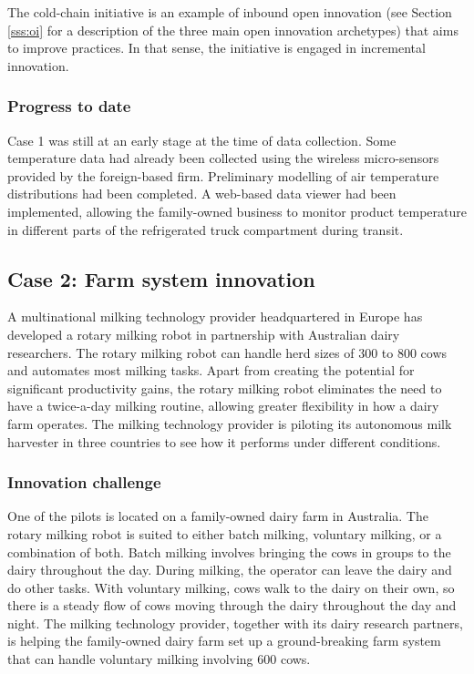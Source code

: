 The cold-chain initiative is an example of inbound open innovation (see Section \ref{sss:oi} for a description of the three main open innovation archetypes) that aims to improve practices. In that sense, the initiative is engaged in incremental innovation. 

\subsubsection{Progress to date}

Case 1 was still at an early stage at the time of data collection. Some temperature data had already been collected using the wireless micro-sensors provided by the foreign-based firm. Preliminary modelling of air temperature distributions had been completed. A web-based data viewer had been implemented, allowing the family-owned business to monitor product temperature in different parts of the refrigerated truck compartment during transit. \medskip

\subsection{Case 2: Farm system innovation}

A multinational milking technology provider headquartered in Europe has developed a rotary milking robot in partnership with Australian dairy researchers. The rotary milking robot can handle herd sizes of 300 to 800 cows and automates most milking tasks. Apart from creating the potential for significant productivity gains, the rotary milking robot eliminates the need to have a twice-a-day milking routine, allowing greater flexibility in how a dairy farm operates. The milking technology provider is piloting its autonomous milk harvester in three countries to see how it performs under different conditions. 

\subsubsection{Innovation challenge}

One of the pilots is located on a family-owned dairy farm in Australia. The rotary milking robot is suited to either batch milking, voluntary milking, or a combination of both. Batch milking involves bringing the cows in groups to the dairy throughout the day. During milking, the operator can leave the dairy and do other tasks. With voluntary milking, cows walk to the dairy on their own, so there is a steady flow of cows moving through the dairy throughout the day and night. The milking technology provider, together with its dairy research partners, is helping the family-owned dairy farm set up a ground-breaking farm system that can handle voluntary milking involving 600 cows. \medskip

